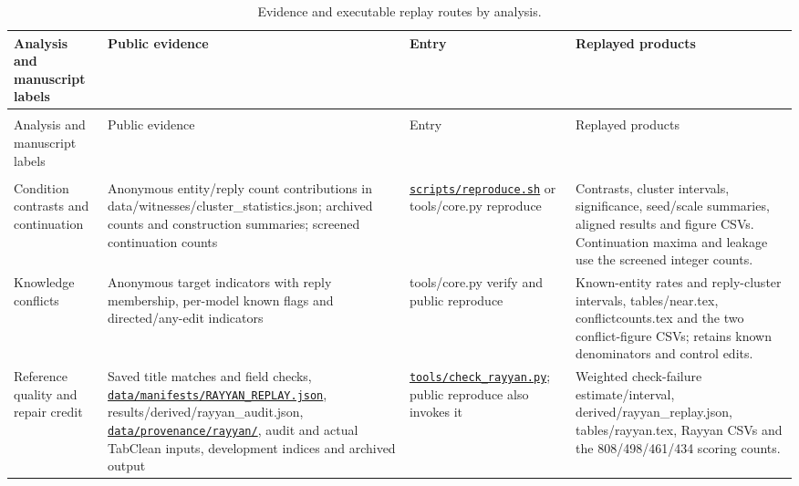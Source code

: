 \documentclass[10pt,a4paper]{article}
\renewcommand{\arraystretch}{1.15}
\renewcommand{\thetable}{S\arabic{table}}
\newcommand{\ensuretablespace}[1]{\par\ifdim\dimexpr\pagegoal-\pagetotal\relax<#1\relax\newpage\fi}
\begin{document}
\ensuretablespace{245pt}
\begingroup\setlength{\tabcolsep}{3pt}\renewcommand{\arraystretch}{1.18}
\small
\begin{longtable}{@{}>{\raggedright\arraybackslash}p{}>{\raggedright\arraybackslash}p{}>{\raggedright\arraybackslash}p{}>{\raggedright\arraybackslash}p{}@{}}
\caption{Evidence and executable replay routes by analysis.}\label{report-table-5-1}\\
\toprule
Analysis and manuscript labels & Public evidence & Entry & Replayed products \\
\midrule
\endfirsthead
\multicolumn{4}{l}{\small Table \thetable\ (continued)}\\
\toprule
Analysis and manuscript labels & Public evidence & Entry & Replayed products \\
\midrule
\endhead
\midrule\multicolumn{4}{r}{\footnotesize Continued on next page}\\\endfoot
\bottomrule\endlastfoot
Condition contrasts and continuation & Anonymous entity/reply count contributions in {\ttfamily\small data/witnesses/\allowbreak{}cluster\_statistics.json}; archived counts and construction summaries; screened continuation counts & \href{https://github.com/hinsonver/CoRe-Benchmark/blob/main/scripts/reproduce.sh}{\nolinkurl{scripts/reproduce.sh}} or {\ttfamily\small tools/\allowbreak{}core.py reproduce} & Contrasts, cluster intervals, significance, seed/scale summaries, aligned results and figure CSVs. Continuation maxima and leakage use the screened integer counts. \\
Knowledge conflicts & Anonymous target indicators with reply membership, per-model known flags and directed/any-edit indicators & {\ttfamily\small tools/\allowbreak{}core.py verify} and public reproduce & Known-entity rates and reply-cluster intervals, {\ttfamily\small tables/\allowbreak{}near.tex}, {\ttfamily\small conflictcounts.tex} and the two conflict-figure CSVs; retains known denominators and control edits. \\
Reference quality and repair credit & Saved title matches and field checks, \href{https://github.com/hinsonver/CoRe-Benchmark/blob/main/data/manifests/RAYYAN_REPLAY.json}{\nolinkurl{data/manifests/RAYYAN_REPLAY.json}}, {\ttfamily\small results/\allowbreak{}derived/\allowbreak{}rayyan\_\allowbreak{}audit.json}, \href{https://github.com/hinsonver/CoRe-Benchmark/blob/main/data/provenance/rayyan/}{\nolinkurl{data/provenance/rayyan/}}, audit and actual TabClean inputs, development indices and archived output & \href{https://github.com/hinsonver/CoRe-Benchmark/blob/main/tools/check_rayyan.py}{\nolinkurl{tools/check_rayyan.py}}; public reproduce also invokes it & Weighted check-failure estimate/interval, {\ttfamily\small derived/\allowbreak{}rayyan\_\allowbreak{}replay.json}, {\ttfamily\small tables/\allowbreak{}rayyan.tex}, Rayyan CSVs and the 808/498/461/434 scoring counts. \\
\end{longtable}\endgroup
\end{document}
